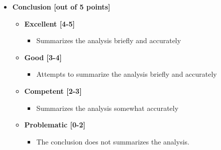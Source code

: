 \documentclass[letterpaper,12pt]{article}
\theoremstyle{dotlessS}
\begin{document}
\begin{itemize}
\item \textbf{Conclusion [out of 5 points]}
\begin{itemize}
\item \textbf{Excellent [4-5]}
\begin{itemize}
\item Summarizes the analysis briefly and accurately
\end{itemize}
\item \textbf{Good [3-4]}
\begin{itemize}
\item Attempts to summarize the analysis briefly and accurately
\end{itemize}
\item \textbf{Competent [2-3]}
\begin{itemize}
\item Summarizes the analysis somewhat accurately
\end{itemize}
\item \textbf{Problematic [0-2]}
\begin{itemize}
\item The conclusion does not summarizes the analysis.
\end{itemize}
\end{itemize}




\end{itemize}
\end{document}
